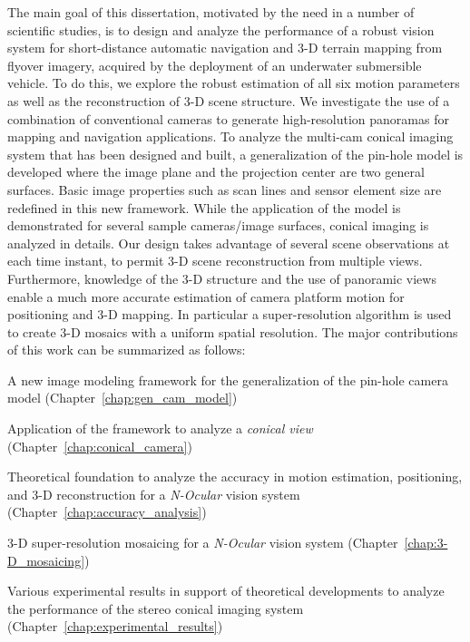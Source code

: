 The main goal of this dissertation, motivated by the need in a number of scientific studies, is to
design and analyze the performance of a robust vision system for short-distance automatic
navigation and 3-D terrain mapping from flyover imagery, acquired by the deployment of an
underwater submersible vehicle. To do this, we explore the robust estimation of all six motion
parameters as well as the reconstruction of 3-D scene structure. We investigate the use of a
combination of conventional cameras to generate high-resolution panoramas for mapping and
navigation applications. To analyze the multi-cam conical imaging system that has been designed and
built, a generalization of the pin-hole model is developed where the image plane and the projection
center are two general surfaces. Basic image properties such as scan lines and sensor element size
are redefined in this new framework. While the application of the model is demonstrated for several
sample cameras/image surfaces, conical imaging is analyzed in details. Our design takes advantage
of several scene observations at each time instant, to permit 3-D scene reconstruction from
multiple views. Furthermore, knowledge of the 3-D structure and the use of panoramic views enable a
much more accurate estimation of camera platform motion for positioning and 3-D mapping. In
particular a super-resolution algorithm is used to create 3-D mosaics with a uniform spatial
resolution. The major contributions of this work can be summarized as follows:

\bi

\item A new image modeling framework for the generalization of the pin-hole camera model (Chapter~\ref{chap:gen_cam_model})

\item Application of the framework to analyze a \emph{conical view} (Chapter~\ref{chap:conical_camera})

\item Theoretical foundation to analyze the accuracy in motion estimation, positioning, and 3-D reconstruction for a \emph{N-Ocular} vision system
(Chapter~\ref{chap:accuracy_analysis})

\item 3-D super-resolution mosaicing for a \emph{N-Ocular} vision system (Chapter~\ref{chap:3-D_mosaicing})

\item Various experimental results in support of theoretical developments to analyze the performance of the stereo conical
imaging system (Chapter~\ref{chap:experimental_results})

